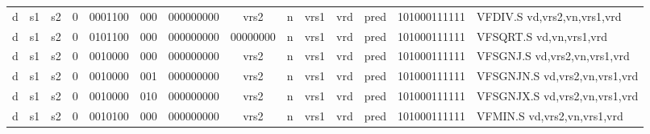\begin{landscape}
\begin{table}[p]
\begin{small}
\begin{center}
\begin{tabular}{p{0.08in}@{}p{0.08in}@{}p{0.08in}@{}p{0.08in}@{}p{0.50in}@{}p{0.30in}@{}p{0.08in}@{}p{0.8in}@{}p{0.48in}@{}p{0.32in}@{}p{0.08in}@{}p{0.8in}@{}p{0.8in}@{}p{0.4in}@{}p{0.56in}l}
\multicolumn{1}{|c|}{d} &
\multicolumn{1}{c|}{s1} &
\multicolumn{1}{c|}{s2} &
\multicolumn{1}{c|}{0} &
\multicolumn{1}{c|}{0001100} &
\multicolumn{1}{c|}{000} &
\multicolumn{2}{c|}{000000000} &
\multicolumn{2}{c|}{vrs2} &
\multicolumn{1}{c|}{n} &
\multicolumn{1}{c|}{vrs1} &
\multicolumn{1}{c|}{vrd} &
\multicolumn{1}{c|}{pred} &
\multicolumn{1}{c|}{101000111111} & VFDIV.S vd,vrs2,vn,vrs1,vrd \\
\cline{1-15}
  

\multicolumn{1}{|c|}{d} &
\multicolumn{1}{c|}{s1} &
\multicolumn{1}{c|}{s2} &
\multicolumn{1}{c|}{0} &
\multicolumn{1}{c|}{0101100} &
\multicolumn{1}{c|}{000} &
\multicolumn{2}{c|}{000000000} &
\multicolumn{2}{c|}{00000000} &
\multicolumn{1}{c|}{n} &
\multicolumn{1}{c|}{vrs1} &
\multicolumn{1}{c|}{vrd} &
\multicolumn{1}{c|}{pred} &
\multicolumn{1}{c|}{101000111111} & VFSQRT.S vd,vn,vrs1,vrd \\
\cline{1-15}
  

\multicolumn{1}{|c|}{d} &
\multicolumn{1}{c|}{s1} &
\multicolumn{1}{c|}{s2} &
\multicolumn{1}{c|}{0} &
\multicolumn{1}{c|}{0010000} &
\multicolumn{1}{c|}{000} &
\multicolumn{2}{c|}{000000000} &
\multicolumn{2}{c|}{vrs2} &
\multicolumn{1}{c|}{n} &
\multicolumn{1}{c|}{vrs1} &
\multicolumn{1}{c|}{vrd} &
\multicolumn{1}{c|}{pred} &
\multicolumn{1}{c|}{101000111111} & VFSGNJ.S vd,vrs2,vn,vrs1,vrd \\
\cline{1-15}
  

\multicolumn{1}{|c|}{d} &
\multicolumn{1}{c|}{s1} &
\multicolumn{1}{c|}{s2} &
\multicolumn{1}{c|}{0} &
\multicolumn{1}{c|}{0010000} &
\multicolumn{1}{c|}{001} &
\multicolumn{2}{c|}{000000000} &
\multicolumn{2}{c|}{vrs2} &
\multicolumn{1}{c|}{n} &
\multicolumn{1}{c|}{vrs1} &
\multicolumn{1}{c|}{vrd} &
\multicolumn{1}{c|}{pred} &
\multicolumn{1}{c|}{101000111111} & VFSGNJN.S vd,vrs2,vn,vrs1,vrd \\
\cline{1-15}
  

\multicolumn{1}{|c|}{d} &
\multicolumn{1}{c|}{s1} &
\multicolumn{1}{c|}{s2} &
\multicolumn{1}{c|}{0} &
\multicolumn{1}{c|}{0010000} &
\multicolumn{1}{c|}{010} &
\multicolumn{2}{c|}{000000000} &
\multicolumn{2}{c|}{vrs2} &
\multicolumn{1}{c|}{n} &
\multicolumn{1}{c|}{vrs1} &
\multicolumn{1}{c|}{vrd} &
\multicolumn{1}{c|}{pred} &
\multicolumn{1}{c|}{101000111111} & VFSGNJX.S vd,vrs2,vn,vrs1,vrd \\
\cline{1-15}
  

\multicolumn{1}{|c|}{d} &
\multicolumn{1}{c|}{s1} &
\multicolumn{1}{c|}{s2} &
\multicolumn{1}{c|}{0} &
\multicolumn{1}{c|}{0010100} &
\multicolumn{1}{c|}{000} &
\multicolumn{2}{c|}{000000000} &
\multicolumn{2}{c|}{vrs2} &
\multicolumn{1}{c|}{n} &
\multicolumn{1}{c|}{vrs1} &
\multicolumn{1}{c|}{vrd} &
\multicolumn{1}{c|}{pred} &
\multicolumn{1}{c|}{101000111111} & VFMIN.S vd,vrs2,vn,vrs1,vrd \\
\cline{1-15}
  


\end{tabular}
\end{center}
\end{small}
\end{table}
\end{landscape}
